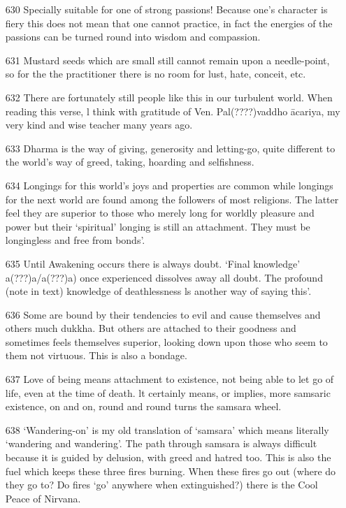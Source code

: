 \begin{itemize}
   
\item[630] Specially suitable for one of strong passions! Because one's character is fiery this does not mean that one cannot practice, in fact the energies of the passions can be turned round into wisdom and compassion.

\item[631] Mustard seeds which are small still cannot remain upon a needle-point, so for the the practitioner there is no room for lust, hate, conceit, etc.

\item[632] There are fortunately still people like this in our turbulent world. When reading this verse, l think with gratitude of Ven. Pal(????)vaddho \=acariya, my very kind and wise teacher many years ago.


\item[633] Dharma is the way of giving, generosity and letting-go, quite different to the world's way of greed, taking, hoarding and selfishness.

\item[634] Longings for this world's joys and properties are common while longings for the next world are found among the followers of most religions. The latter feel they are superior to those who merely long for worldly pleasure and power but their `spiritual' longing is still an attachment. They must be longingless and free from bonds'.

\item[635] Until Awakening occurs there is always doubt. `Final knowledge' a(???)a/a(???)a) once experienced dissolves away all doubt. The profound (note in text) knowledge of deathlessness ls another way of saying this'. 

\item[636] Some are bound by their tendencies to evil and cause themselves and others much dukkha. But others are attached to their goodness and sometimes feels themselves superior, looking down upon those who seem to them not virtuous. This is also a bondage.

\item[637] Love of being means attachment to existence, not being able to let go of life, even at the time of death. lt certainly means, or implies, more samsaric existence, on and on, round and round turns the samsara wheel. 

\item[638] `Wandering-on' is my old translation of `samsara' which means literally `wandering and wandering'. The path through samsara is always difficult because it is guided by delusion, with greed and hatred too. This is also the fuel which keeps these three fires burning. When these fires go out (where do they go to? Do fires `go' anywhere when extinguished?) there is the Cool Peace of Nirvana.


\end{itemize}
